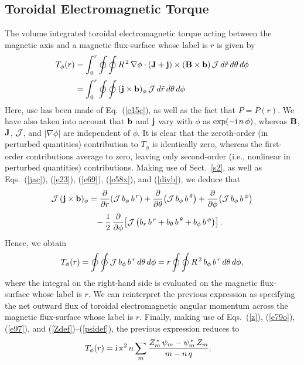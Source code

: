\documentclass[12pt,prb,aps]{revtex4-1}
\begin{document}
\subsection{Toroidal Electromagnetic Torque}
The volume integrated toroidal electromagnetic torque acting between the magnetic axis and a magnetic flux-surface whose label is $r$ is given by
\begin{align}
T_\phi(r) &=\int_0^r\oint\oint R^{\,2}\,\nabla\phi\cdot({\bf J}+{\bf j})\times ({\bf B}\times {\bf b})\,{\cal J}\,d\tilde{r}\,d\theta\,d\phi\nonumber\\[0.5ex]
&=
\int_0^r\oint\oint\,  ({\bf j}\times {\bf b})_\phi\,{\cal J}\,d\tilde{r}\,d\theta\,d\phi
\end{align}
Here, use has been made of Eq.~(\ref{e15c}), as well as the fact that $P=P(r)$. We have also taken into account that ${\bf b}$ and ${\bf j}$ vary with $\phi$ as
$\exp(-{\rm i}\,n\,\phi)$, whereas ${\bf B}$, ${\bf J}$, ${\cal J}$, and $|\nabla\phi|$ are independent of $\phi$. It is clear that the zeroth-order (in perturbed quantities) contribution
to $T_\phi$ is identically zero, whereas the first-order contributions average to zero, leaving only second-order (i.e., nonlinear in perturbed quantities) contributions. 
Making use of Sect.~\ref{s2}, as well as Eqs.~(\ref{jac}), (\ref{e23}), (\ref{e69}), (\ref{e58x}), and (\ref{divb}), we deduce that
\begin{align}
{\cal J}\,({\bf j}\times {\bf b})_\phi&=\frac{\partial}{\partial r}\!\left({\cal J}\,b_\phi\,b^{\,r}\right)+\frac{\partial}{\partial\theta}\!\left({\cal J}\,b_\phi\,b^{\,\theta}\right)+\frac{\partial}{\partial \phi}\!\left({\cal J}\,b_\phi\,b^{\,\phi}\right)\nonumber\\[0.5ex]
&\phantom{=}-\frac{1}{2}\,\frac{\partial}{\partial\phi}\!\left[{\cal J}\left(b_r\,b^{\,r} + b_\theta\,b^{\,\theta}+b_\phi\,b^{\,\phi}\right)\right].
\end{align}
Hence, we obtain 
\begin{equation}\label{torque}
T_\phi(r)=\oint\oint {\cal J}\,b_\phi\,b^{\,r}\,d\theta\,d\phi=  r\oint\oint R^{\,2}\,b_\phi\,b^{\,r}\,d\theta\,d\phi,
\end{equation}
where the integral on the right-hand side is evaluated on the magnetic flux-surface whose label is $r$. We can reinterpret the
previous expression as specifying the net outward flux of toroidal electromagnetic angular momentum across the magnetic flux-surface whose label is $r$. 
Finally, making use of Eqs.~(\ref{z}), (\ref{e79o}), (\ref{e97}), and (\ref{Zdef})--(\ref{psidef}), the previous expression reduces to\,\cite{am1}
\begin{align}\label{etorque}
T_\phi(r) &= {\rm i}\,\pi^2\,n\sum_{m}\frac{Z_m^{\,\ast}\,\psi_m-\psi_m^{\,\ast}\,Z_m}{m-n\,q}.
\end{align}
 
\end{document}
